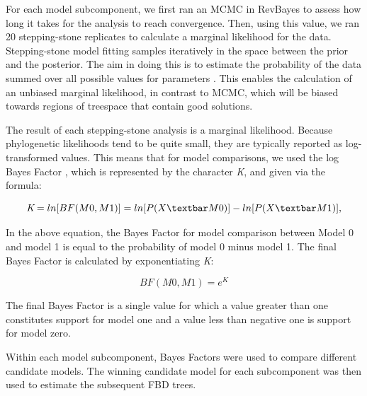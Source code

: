 \documentclass{article}
\begin{document}
For each model subcomponent, we first ran an MCMC in RevBayes to assess how long it takes for the analysis to reach convergence. 
Then, using this value, we ran 20 stepping-stone replicates to calculate a marginal likelihood for the data.
Stepping-stone model fitting samples iteratively in the space between the prior and the posterior.
The aim in doing this is to estimate the probability of the data summed over all possible values for parameters  \citep{Xie2011}. 
This enables the calculation of an unbiased marginal likelihood, in contrast to MCMC, which will be biased towards regions of treespace that contain good solutions. 

The result of each stepping-stone analysis is a marginal likelihood.
Because phylogenetic likelihoods tend to be quite small, they are typically reported as log-transformed values.
This means that for model comparisons, we used the log Bayes Factor \citep{Kass1995}, which is represented by the character \textit{K}, and given via the formula:

\begin{center}
  \[  \textit{K}=ln[BF(M0,M1)]=ln[P(X \textbar M0)] - ln[P(X \textbar M1)],  \]
\end{center}    
    
In the above equation, the Bayes Factor for model comparison between Model 0 and model 1 is equal to the probability of model 0 minus model 1. The final Bayes Factor is calculated by exponentiating \textit{K}:

\begin{center}
  \[  BF(M0,M1)=\textit{e}^\textit{K} \]
\end{center}

The final Bayes Factor is a single value for which a value greater than one constitutes support for model one and a value less than negative one is support for model zero. 

 Within each model subcomponent, Bayes Factors were used to compare different candidate models. 
The winning candidate model for each subcomponent was then used to estimate the subsequent FBD trees.
\end{document}
